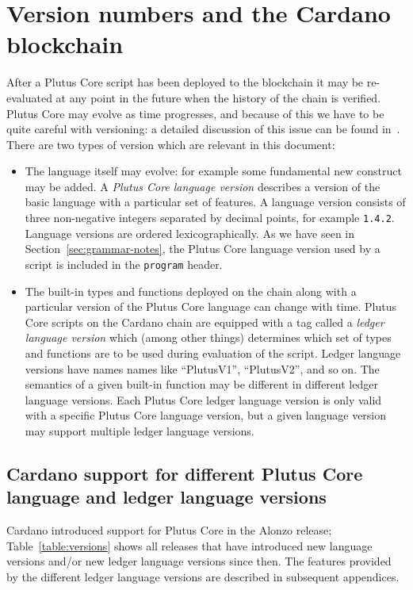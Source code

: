 \section{Version numbers and the Cardano blockchain}
\label{appendix:version-numbers}
After a Plutus Core script has been deployed to the blockchain it may be
re-evaluated at any point in the future when the history of the chain is
verified.  Plutus Core may evolve as time progresses, and because of this we
have to be quite careful with versioning: a detailed discussion of this issue
can be found in~\cite{CIP-35}.  There are two types of version which are
relevant in this document:

\begin{itemize}
\item The language itself may evolve: for example some fundamental new construct
  may be added.  A \textit{Plutus Core language version} describes a version of
  the basic language with a particular set of features. A language version
  consists of three non-negative integers separated by decimal points, for
  example \texttt{1.4.2}.  Language versions are ordered lexicographically.  As
  we have seen in Section~\ref{sec:grammar-notes}, the Plutus Core
  language version used by a script is included in the \texttt{program} header.
  
\item The built-in types and functions deployed on the chain along with a
  particular version of the Plutus Core language can change with time.  Plutus
  Core scripts on the Cardano chain are equipped with a tag called a
  \textit{ledger language version} which (among other things) determines which
  set of types and functions are to be used during evaluation of the script.
  Ledger language versions have names names like ``PlutusV1'', ``PlutusV2'',
  and so on.  The semantics of a given built-in function may be different in
  different ledger language versions.  Each Plutus Core ledger language version
  is only valid with a specific Plutus Core language version, but a given
  language version may support multiple ledger language versions.
\end{itemize}

\subsection{Cardano support for different Plutus Core language and ledger language versions}

Cardano introduced support for Plutus Core in the Alonzo release;
Table~\ref{table:versions} shows all releases that have introduced new language
versions and/or new ledger language versions since then.  The features provided
by the different ledger language versions are described in subsequent appendices.

